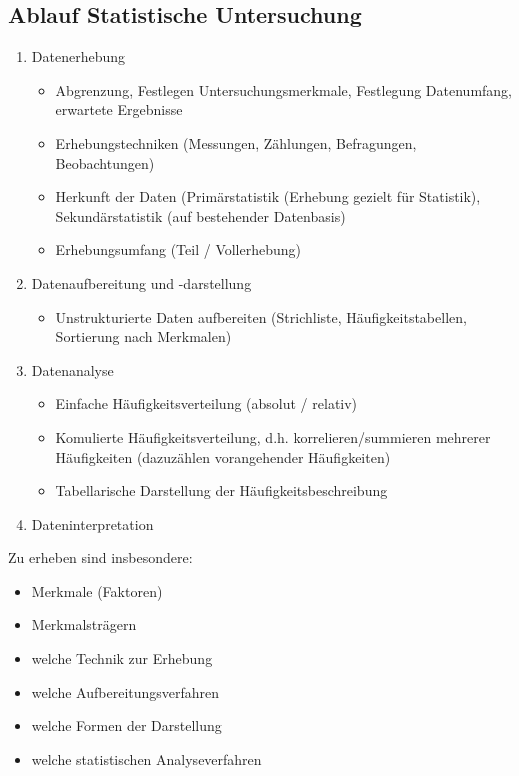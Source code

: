 \subsection{Ablauf Statistische Untersuchung}
\begin{enumerate}
	\item	Datenerhebung
		\begin{itemize}
			\item	Abgrenzung, Festlegen Untersuchungsmerkmale, Festlegung Datenumfang, erwartete Ergebnisse
			\item	Erhebungstechniken (Messungen, Zählungen, Befragungen, Beobachtungen)
			\item	Herkunft der Daten (Primärstatistik (Erhebung gezielt für Statistik), Sekundärstatistik (auf bestehender Datenbasis)
			\item Erhebungsumfang (Teil / Vollerhebung)
		\end{itemize}
	\item	Datenaufbereitung und -darstellung
		\begin{itemize}
			\item Unstrukturierte Daten aufbereiten (Strichliste, Häufigkeitstabellen, Sortierung nach Merkmalen)
		\end{itemize}
	\item	Datenanalyse
		\begin{itemize}
			\item Einfache Häufigkeitsverteilung (absolut / relativ)
			\item Komulierte Häufigkeitsverteilung, d.h. korrelieren/summieren mehrerer Häufigkeiten (dazuzählen vorangehender Häufigkeiten)
			\item Tabellarische Darstellung der Häufigkeitsbeschreibung
		\end{itemize}
	\item	Dateninterpretation
\end{enumerate}

Zu erheben sind insbesondere:
\begin{itemize}
	\item Merkmale (Faktoren)
	\item Merkmalsträgern
	\item welche Technik zur Erhebung
	\item welche Aufbereitungsverfahren
	\item welche Formen der Darstellung
	\item welche statistischen Analyseverfahren
\end{itemize}


